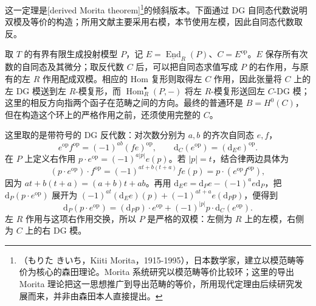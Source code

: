 这一定理是[derived Morita theorem]\footnote{（もりた きいち，Kiiti Morita，1915-1995），日本数学家，建立以模范畴等价为核心的森田理论。Morita 系统研究以模范畴等价比较环；这里的导出 Morita 理论把这一思想推广到导出范畴的等价，所用现代定理由后续研究发展而来，并非由森田本人直接提出。}的倾斜版本。下面通过 DG 自同态代数说明双模及等价的构造；所用文献主要采用右模，本节使用左模，因此自同态代数取反。

\begin{proofsketch}
	取 \(T\) 的有界有限生成投射模型 \(P\)，记 \(E=\underline{\operatorname{End}}_R(P)\)、\(C=E^{\mathrm{op}}\)。\(E\) 保存所有次数的自同态及其微分；取反代数 \(C\) 后，可以把自同态求值写成 \(P\) 的右作用，与原有的左 \(R\) 作用配成双模。相应的 Hom 复形则取得左 \(C\) 作用，因此张量将 \(C\) 上的左 DG 模送到左 \(R\)-模复形，而 \(\operatorname{Hom}_R^\bullet(P,-)\) 将左 \(R\)-模复形送回左 \(C\)-DG 模；这里的相反方向指两个函子在范畴之间的方向。最终的普通环是 \(B=H^0(C)\)，但在构造这个环上的严格作用之前，还须使用完整的 \(C\)。

	这里取的是带符号的 DG 反代数：对次数分别为 \(a,b\) 的齐次自同态 \(e,f\)，
	\[
		e^{\mathrm{op}}f^{\mathrm{op}}=(-1)^{ab}(fe)^{\mathrm{op}}, \qquad \mathrm d_C(e^{\mathrm{op}})=(\mathrm d_Ee)^{\mathrm{op}}.
	\]
	在 \(P\) 上定义右作用 \(p\cdot e^{\mathrm{op}}=(-1)^{a|p|}e(p)\)。若 \(|p|=t\)，结合律两边具体为
	\[
		(p\cdot e^{\mathrm{op}})\cdot f^{\mathrm{op}} =(-1)^{at+b(t+a)}fe(p) =p\cdot(e^{\mathrm{op}}f^{\mathrm{op}}),
	\]
	因为 \(at+b(t+a)=(a+b)t+ab\)。再用 \(\mathrm d_Ee=\mathrm d_Pe-(-1)^ae\mathrm d_P\)，把 \(\mathrm d_P(p\cdot e^{\mathrm{op}})\) 展开为 \((-1)^{at}(\mathrm d_Ee)(p)+(-1)^{at+a}e(\mathrm d_Pp)\)，便得到
	\[
		\mathrm d_P(p\cdot e^{\mathrm{op}}) =(\mathrm d_Pp)\cdot e^{\mathrm{op}} +(-1)^{|p|}p\cdot\mathrm d_C(e^{\mathrm{op}}).
	\]
	左 \(R\) 作用与这项右作用交换，所以 \(P\) 是严格的双模：左侧为 \(R\) 上的左模，右侧为 \(C\) 上的右 DG 模。


\end{proofsketch}
